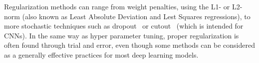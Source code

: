 Regularization methods can range from weight penalties, using the L1- or
L2-norm (also known as Least Absolute Deviation and Lest Squares regressions),
to more stochastic techniques such as dropout~\cite{Dropout} or
cutout~\cite{Cutout} (which is intended for CNNs). In the same way as
hyper parameter tuning, proper regularization is often found through trial and
error, even though some methods can be considered as a generally effective
practices for most deep learning models.

